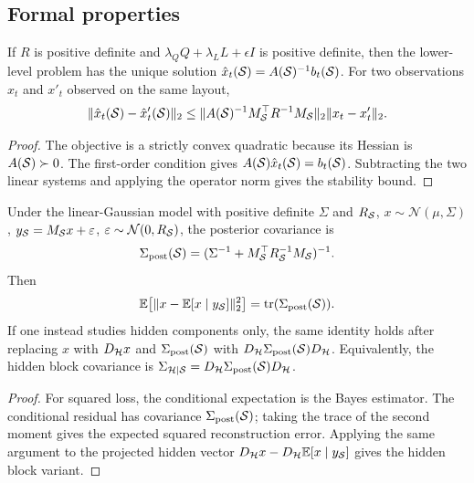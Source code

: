 \subsection{Formal properties}

\begin{theorem}
\label{thm:map-stability}
If $R$ is positive definite and
$\lambda_Q Q+\lambda_L L+\epsilon I$ is positive definite, then the lower-level
problem has the unique solution
$\hat{x}_t(\mathcal{S})=A(\mathcal{S})^{-1}b_t(\mathcal{S})$. For two observations $x_t$ and
$x'_t$ observed on the same layout,
\[
    \|\hat{x}_t(\mathcal{S})-\hat{x}'_t(\mathcal{S})\|_2
    \le
    \|A(\mathcal{S})^{-1}M_{\mathcal{S}}^{\top}R^{-1}M_{\mathcal{S}}\|_2
    \|x_t-x'_t\|_2 .
\]
\end{theorem}

\begin{proof}
The objective is a strictly convex quadratic because its Hessian is
$A(\mathcal{S})\succ 0$. The first-order condition gives
$A(\mathcal{S})\hat{x}_t(\mathcal{S})=b_t(\mathcal{S})$. Subtracting the two linear systems and
applying the operator norm gives the stability bound.
\end{proof}

\begin{theorem}
\label{thm:trace-risk}
Under the linear-Gaussian model with positive definite $\Sigma$ and $R_{\mathcal{S}}$,
$x\sim\mathcal{N}(\mu,\Sigma)$, $y_{\mathcal{S}}=M_{\mathcal{S}}x+\varepsilon$,
$\varepsilon\sim\mathcal{N}(0,R_{\mathcal{S}})$, the posterior covariance is
\[
    \Sigma_{\mathrm{post}}(\mathcal{S})
    =
    (\Sigma^{-1}+M_{\mathcal{S}}^{\top}R_{\mathcal{S}}^{-1}M_{\mathcal{S}})^{-1}.
\]
Then
\[
    \mathbb{E}\!\left[\|x-\mathbb{E}[x\mid y_{\mathcal{S}}]\|_2^2\right]
    =
    \operatorname{tr}(\Sigma_{\mathrm{post}}(\mathcal{S})).
\]
If one instead studies hidden components only, the same identity holds after
replacing $x$ with $D_{\mathcal{H}}x$ and $\Sigma_{\mathrm{post}}(\mathcal{S})$ with
$D_{\mathcal{H}}\Sigma_{\mathrm{post}}(\mathcal{S})D_{\mathcal{H}}$. Equivalently, the hidden
block covariance is
$\Sigma_{\mathcal{H}|\mathcal{S}}=D_{\mathcal{H}}\Sigma_{\mathrm{post}}(\mathcal{S})D_{\mathcal{H}}$.
\end{theorem}

\begin{proof}
For squared loss, the conditional expectation is the Bayes estimator. The
conditional residual has covariance $\Sigma_{\mathrm{post}}(\mathcal{S})$; taking the
trace of the second moment gives the expected squared reconstruction error.
Applying the same argument to the projected hidden vector
$D_{\mathcal{H}}x-D_{\mathcal{H}}\mathbb{E}[x\mid y_{\mathcal{S}}]$ gives the hidden block variant.
\end{proof}

